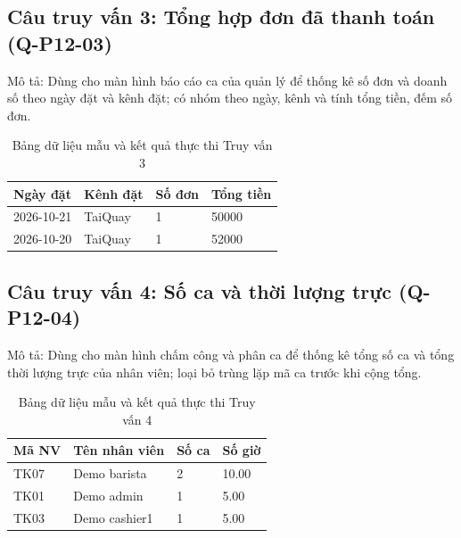 \subsection{Câu truy vấn 3: Tổng hợp đơn đã thanh toán (Q-P12-03)}
Mô tả: Dùng cho màn hình báo cáo ca của quản lý để thống kê số đơn và doanh số theo ngày đặt và kênh đặt; có nhóm theo ngày, kênh và tính tổng tiền, đếm số đơn.
\begin{table}[H]
\centering\small
\caption{Bảng dữ liệu mẫu và kết quả thực thi Truy vấn 3}
\begin{tabularx}{\linewidth}{@{}XXXX@{}}\toprule
\textbf{Ngày đặt} & \textbf{Kênh đặt} & \textbf{Số đơn} & \textbf{Tổng tiền}\\\midrule
2026-10-21 & TaiQuay & 1 & 50000\\
2026-10-20 & TaiQuay & 1 & 52000\\
\bottomrule\end{tabularx}\end{table}
\subsection{Câu truy vấn 4: Số ca và thời lượng trực (Q-P12-04)}
Mô tả: Dùng cho màn hình chấm công và phân ca để thống kê tổng số ca và tổng thời lượng trực của nhân viên; loại bỏ trùng lặp mã ca trước khi cộng tổng.
\begin{table}[H]
\centering\small
\caption{Bảng dữ liệu mẫu và kết quả thực thi Truy vấn 4}
\begin{tabularx}{\linewidth}{@{}XXXX@{}}\toprule
\textbf{Mã NV} & \textbf{Tên nhân viên} & \textbf{Số ca} & \textbf{Số giờ}\\\midrule
TK07 & Demo barista & 2 & 10.00\\
TK01 & Demo admin & 1 & 5.00\\
TK03 & Demo cashier1 & 1 & 5.00\\
\bottomrule\end{tabularx}\end{table}
